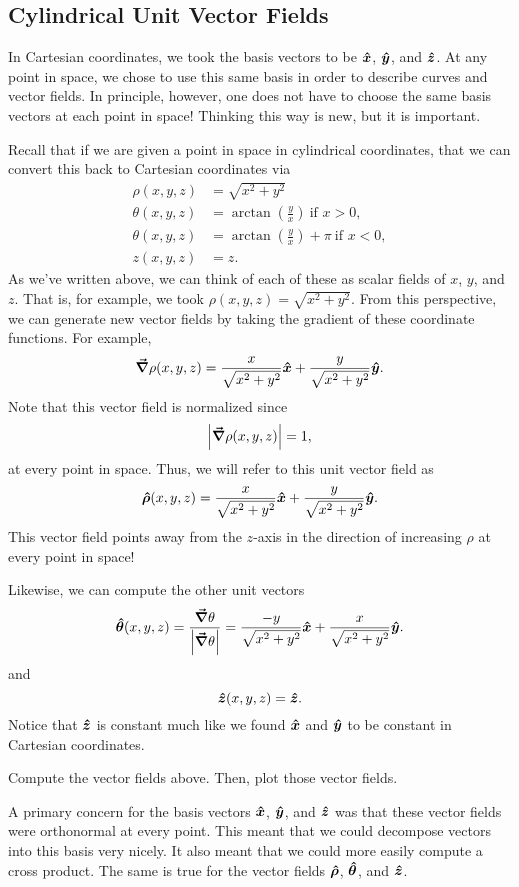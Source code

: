 \subsection{Cylindrical Unit Vector Fields}

In Cartesian coordinates, we took the basis vectors to be $\boldsymbol{\hat{x}}$, $\boldsymbol{\hat{y}}$, and $\boldsymbol{\hat{z}}$. At any point in space, we chose to use this same basis in order to describe curves and vector fields. In principle, however, one does not have to choose the same basis vectors at each point in space!  Thinking this way is new, but it is important.  

Recall that if we are given a point in space in cylindrical coordinates, that we can convert this back to Cartesian coordinates via
\begin{align*}
\rho(x,y,z) &= \sqrt{x^2+y^2}\\
\theta(x,y,z) &= \arctan\left(\frac{y}{x}\right) ~\textrm{if $x>0$}, \\
\theta(x,y,z) &= \arctan\left(\frac{y}{x}\right) + \pi ~\textrm{if $x<0$},\\
z(x,y,z) &= z.
\end{align*}
As we've written above, we can think of each of these as scalar fields of $x$, $y$, and $z$.  That is, for example, we took $\rho(x,y,z)=\sqrt{x^2+y^2}$.  From this perspective, we can generate new vector fields by taking the gradient of these coordinate functions.  For example,
\[
\boldsymbol{\vec{\nabla}} \rho(x,y,z) = \frac{x}{\sqrt{x^2+y^2}}\boldsymbol{\hat{x}} + \frac{y}{\sqrt{x^2+y^2}}\boldsymbol{\hat{y}}.  
\]
Note that this vector field is normalized since
\[
\left|\boldsymbol{\vec{\nabla}} \rho(x,y,z)\right| = 1,
\]
at every point in space.  Thus, we will refer to this unit vector field as
\[
\boldsymbol{\hat{\rho}}(x,y,z) = \frac{x}{\sqrt{x^2+y^2}}\boldsymbol{\hat{x}} + \frac{y}{\sqrt{x^2+y^2}}\boldsymbol{\hat{y}}.
\]
This vector field points away from the $z$-axis in the direction of increasing $\rho$ at every point in space!

Likewise, we can compute the other unit vectors
\[
\boldsymbol{\hat{\theta}}(x,y,z) = \frac{\boldsymbol{\vec{\nabla}} \theta}{\left| \boldsymbol{\vec{\nabla}} \theta \right|} = \frac{-y}{\sqrt{x^2+y^2}}\boldsymbol{\hat{x}} + \frac{x}{\sqrt{x^2+y^2}}\boldsymbol{\hat{y}}.
\]
and
\[
\boldsymbol{\hat{z}}(x,y,z) = \boldsymbol{\hat{z}}.
\]
Notice that $\boldsymbol{\hat{z}}$ is constant much like we found $\boldsymbol{\hat{x}}$ and $\boldsymbol{\hat{y}}$ to be constant in Cartesian coordinates.

\begin{exercise}
    Compute the vector fields above. Then, plot those vector fields.
\end{exercise}

A primary concern for the basis vectors $\boldsymbol{\hat{x}}$, $\boldsymbol{\hat{y}}$, and $\boldsymbol{\hat{z}}$ was that these vector fields were orthonormal at every point. This meant that we could decompose vectors into this basis very nicely.  It also meant that we could more easily compute a cross product.  The same is true for the vector fields $\boldsymbol{\hat{\rho}}$, $\boldsymbol{\hat{\theta}}$, and $\boldsymbol{\hat{z}}$.  

